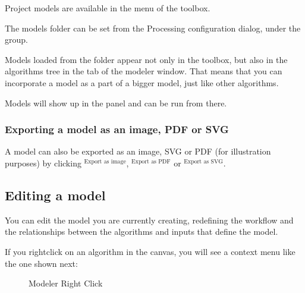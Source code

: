 \documentclass[letterpaper,10pt,english]{sphinxmanual}
\begin{document}
\sphinxAtStartPar
Project models are available in the
 menu of the toolbox.

\sphinxAtStartPar
The models folder can be set from the Processing configuration dialog,
under the  group.

\sphinxAtStartPar
Models loaded from the  folder appear not only in the
toolbox, but also in the algorithms tree in the 
tab of the modeler window.
That means that you can incorporate a model as a part of a bigger model,
just like other algorithms.

\sphinxAtStartPar
Models will show up in the  panel and can be run
from there.


\subsubsection{Exporting a model as an image, PDF or SVG}
\label{\detokenize{Introduction/models:exporting-a-model-as-an-image-pdf-or-svg}}
\sphinxAtStartPar
A model can also be exported as an image, SVG or PDF (for illustration
purposes) by clicking $^{\text{Export as image}}$,
$^{\text{Export as PDF}}$ or $^{\text{Export as SVG}}$.


\subsection{Editing a model}
\label{\detokenize{Introduction/models:editing-a-model}}
\sphinxAtStartPar
You can edit the model you are currently creating, redefining the
workflow and the relationships between the algorithms and inputs that
define the model.

\sphinxAtStartPar
If you right\sphinxhyphen{}click on an algorithm in the canvas, you will see a context
menu like the one shown next:

\begin{figure}[H]
\centering
\capstart

\noindent{}
\caption{Modeler Right Click}\label{\detokenize{Introduction/models:id10}}\label{\detokenize{Introduction/models:figure-model-right-click}}\end{figure}
\end{document}

